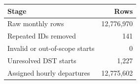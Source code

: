 \begin{tabular}{lr}
\toprule
Stage & Rows \\
\midrule
Raw monthly rows & 12,776,970 \\
Repeated IDs removed & 141 \\
Invalid or out-of-scope starts & 0 \\
Unresolved DST starts & 1,227 \\
Assigned hourly departures & 12,775,602 \\
\bottomrule
\end{tabular}
